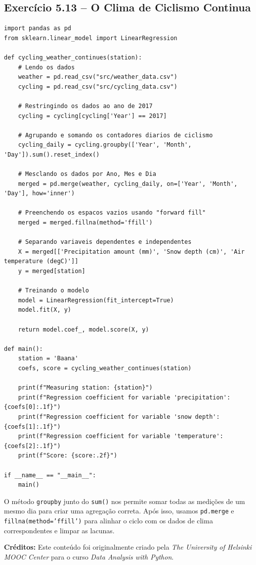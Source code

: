 \documentclass[11pt,a4paper]{article}
\begin{document}
\subsection*{Exercício 5.13 -- O Clima de Ciclismo Continua}
\begin{solucao}
\begin{lstlisting}
import pandas as pd
from sklearn.linear_model import LinearRegression

def cycling_weather_continues(station):
    # Lendo os dados
    weather = pd.read_csv("src/weather_data.csv")
    cycling = pd.read_csv("src/cycling_data.csv")
    
    # Restringindo os dados ao ano de 2017
    cycling = cycling[cycling['Year'] == 2017]
    
    # Agrupando e somando os contadores diarios de ciclismo
    cycling_daily = cycling.groupby(['Year', 'Month', 'Day']).sum().reset_index()
    
    # Mesclando os dados por Ano, Mes e Dia
    merged = pd.merge(weather, cycling_daily, on=['Year', 'Month', 'Day'], how='inner')
    
    # Preenchendo os espacos vazios usando "forward fill"
    merged = merged.fillna(method='ffill')
    
    # Separando variaveis dependentes e independentes
    X = merged[['Precipitation amount (mm)', 'Snow depth (cm)', 'Air temperature (degC)']]
    y = merged[station]
    
    # Treinando o modelo
    model = LinearRegression(fit_intercept=True)
    model.fit(X, y)
    
    return model.coef_, model.score(X, y)

def main():
    station = 'Baana'
    coefs, score = cycling_weather_continues(station)
    
    print(f"Measuring station: {station}")
    print(f"Regression coefficient for variable 'precipitation': {coefs[0]:.1f}")
    print(f"Regression coefficient for variable 'snow depth': {coefs[1]:.1f}")
    print(f"Regression coefficient for variable 'temperature': {coefs[2]:.1f}")
    print(f"Score: {score:.2f}")

if __name__ == "__main__":
    main()
\end{lstlisting}
O método \texttt{groupby} junto do \texttt{sum()} nos permite somar todas as medições de um mesmo dia para criar uma agregação correta. Após isso, usamos \texttt{pd.merge} e \texttt{fillna(method='ffill')} para alinhar o ciclo com os dados de clima correspondentes e limpar as lacunas.
\end{solucao}

\vspace{2em}
\noindent\textbf{Créditos:} Este conteúdo foi originalmente criado pela \textit{The University of Helsinki MOOC Center} para o curso \textit{Data Analysis with Python}.
\end{document}
